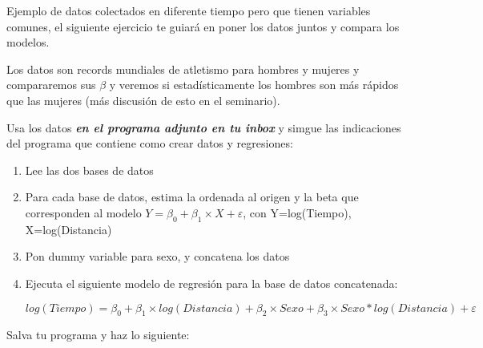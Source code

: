 \documentclass[letterpaper,11pt]{article}
\begin{document}
Ejemplo de datos colectados en diferente tiempo pero que tienen variables comunes, el siguiente ejercicio te 
guiar\'a en poner los datos juntos y compara los modelos.

Los datos son records mundiales de atletismo para hombres y mujeres y compararemos sus $\beta$ y
veremos si estad\'isticamente los hombres son m\'as r\'apidos que las mujeres (m\'as discusi\'on de esto en 
el seminario).

Usa los datos \textit{\textbf{en el programa adjunto en tu inbox}} y simgue las indicaciones del programa que contiene
como crear datos y regresiones:

\begin{enumerate}	
\item Lee las dos bases de datos

\item Para cada base de datos, estima la ordenada al origen y la beta que corresponden al modelo
$Y=\beta_{0}+ \beta_{1} \times X+ \varepsilon$, con Y=log(Tiempo), X=log(Distancia)

\item Pon dummy variable para sexo, y concatena los datos

\item Ejecuta el siguiente modelo de regresi\'on para la base de datos concatenada:

$log(Tiempo)=\beta_{0}+ \beta_{1} \times log(Distancia)+ \beta_{2} \times Sexo+ \beta_{3} \times Sexo*log(
Distancia)+ \varepsilon$

\end{enumerate}	

Salva tu programa y haz lo siguiente:
\end{document}
